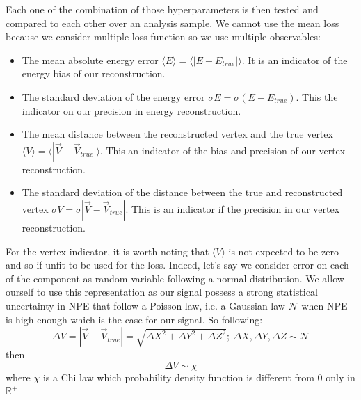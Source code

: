 Each one of the combination of those hyperparameters is then tested and compared to each other over an analysis sample. We cannot use the mean loss because we consider multiple loss function so we use multiple observables:
\begin{itemize}
  \item The mean absolute energy error $\langle E \rangle = \langle | E - E_{true} | \rangle$. It is an indicator of the energy bias of our reconstruction.
  \item The standard deviation of the energy error $\sigma E = \sigma (E - E_{true})$. This the indicator on our precision in energy reconstruction.
  \item The mean distance between the reconstructed vertex and the true vertex $\langle V \rangle = \langle | \vec{V} - \vec{V}_{true} | \rangle$. This an indicator of the bias and precision of our vertex reconstruction.
  \item The standard deviation of the distance between the true and reconstructed vertex $\sigma V = \sigma |\vec{V} - \vec{V}_{true}|$. This is an indicator if the precision in our vertex reconstruction.
\end{itemize}

For the vertex indicator, it is worth noting that $\langle V \rangle$ is not expected to be zero and so if unfit to be used for the loss. Indeed, let's say we consider error on each of the component as random variable following a normal distribution. We allow ourself to use this representation as our signal possess a strong statistical uncertainty in NPE that follow a Poisson law, i.e. a Gaussian law $\mathcal{N}$ when NPE is high enough which is the case for our signal. So following:
\begin{equation}
  \Delta V = |\vec{V} - \vec{V}_{true}| = \sqrt{\Delta X^2 + \Delta Y^2 + \Delta Z^2}; ~ \Delta X, \Delta Y, \Delta Z \sim \mathcal{N}
\end{equation}
then
\begin{equation}
  \Delta V \sim \chi
\end{equation}
where $\chi$ is a Chi law which probability density function is different from 0 only in $\mathbb{R}^+$


